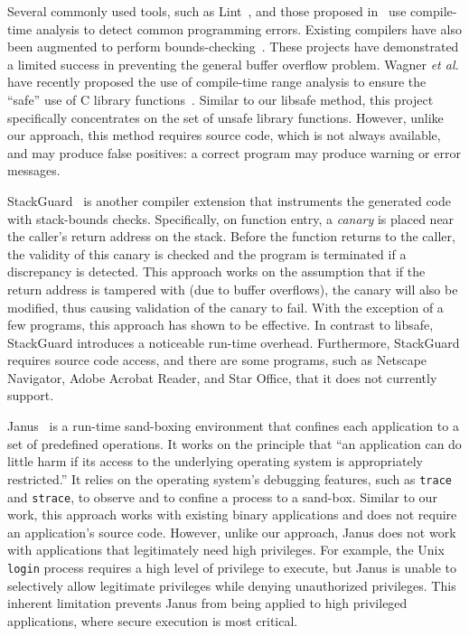 \documentclass[]{article}
\begin{document}
Several commonly used tools, such as Lint~\cite{lint78}, and those
proposed in~\cite{Evans96} use compile-time analysis to detect common
programming errors.  Existing compilers have also been augmented to
perform bounds-checking~\cite{gcc-extensions}.  These projects have
demonstrated a limited success in preventing the general buffer
overflow problem.  Wagner {\em et al.\/} have recently proposed the
use of compile-time range analysis to ensure the ``safe'' use of C
library functions~\cite{wagner00}.  Similar to our libsafe method,
this project specifically concentrates on the set of unsafe library
functions.  However, unlike our approach, this method requires source
code, which is not always available, and may produce false positives:
a correct program may produce warning or error messages.

StackGuard~\cite{stackguard98} is another compiler extension that
instruments the generated code with stack-bounds checks.
Specifically, on function entry, a {\em canary} is placed near the
caller's return address on the stack.  Before the function returns to
the caller, the validity of this canary is checked and the program is
terminated if a discrepancy is detected.  This approach works on the
assumption that if the return address is tampered with (due to buffer
overflows), the canary will also be modified, thus causing validation
of the canary to fail.  With the exception of a few programs, this
approach has shown to be effective.  In contrast to libsafe,
StackGuard introduces a noticeable run-time overhead.  Furthermore,
StackGuard requires source code access, and there are some programs,
such as Netscape Navigator, Adobe Acrobat Reader, and Star Office,
that it does not currently support.

Janus~\cite{goldberg96:secure} is a run-time sand-boxing environment
that confines each application to a set of predefined operations.  It
works on the principle that ``an application can do little harm if its
access to the underlying operating system is appropriately
restricted.''  It relies on the operating system's debugging features,
such as {\tt trace} and {\tt strace}, to observe and to confine a
process to a sand-box.  Similar to our work, this approach works with
existing binary applications and does not require an application's
source code.  However, unlike our approach, Janus does not work with
applications that legitimately need high privileges.  For example, the
Unix {\tt login} process requires a high level of privilege to
execute, but Janus is unable to selectively allow legitimate
privileges while denying unauthorized privileges.  This inherent
limitation prevents Janus from being applied to high privileged
applications, where secure execution is most critical.
\end{document}
